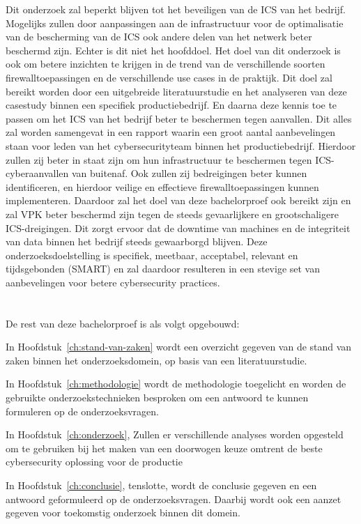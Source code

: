 Dit onderzoek zal beperkt blijven tot het beveiligen van de ICS van het bedrijf. Mogelijks zullen door aanpassingen aan de infrastructuur voor de optimalisatie van de bescherming van de ICS ook andere delen van het netwerk beter beschermd zijn. Echter is dit niet het hoofddoel. Het doel van dit onderzoek is ook om betere inzichten te krijgen in de trend van de verschillende soorten firewalltoepassingen en de verschillende use cases in de praktijk. Dit doel zal bereikt worden door een uitgebreide literatuurstudie en het analyseren van deze casestudy binnen een specifiek productiebedrijf. En daarna deze kennis toe te passen om het ICS van het bedrijf beter te beschermen tegen aanvallen. Dit alles zal worden samengevat in een rapport waarin een groot aantal aanbevelingen staan voor leden van het cybersecurityteam binnen het productiebedrijf. Hierdoor zullen zij beter in staat zijn om hun infrastructuur te beschermen tegen ICS-cyberaanvallen van buitenaf. Ook zullen zij bedreigingen beter kunnen identificeren, en hierdoor veilige en effectieve firewalltoepassingen kunnen implementeren. Daardoor zal het doel van deze bachelorproef ook bereikt zijn en zal VPK beter beschermd zijn tegen de steeds gevaarlijkere en grootschaligere ICS-dreigingen. Dit zorgt ervoor dat de downtime van machines en de integriteit van data binnen het bedrijf steeds gewaarborgd blijven. Deze onderzoeksdoelstelling is specifiek, meetbaar, acceptabel, relevant en tijdsgebonden (SMART) en zal daardoor resulteren in een stevige set van aanbevelingen voor betere cybersecurity practices.

\section{}%
\label{sec:opzet-bachelorproef}


De rest van deze bachelorproef is als volgt opgebouwd:

In Hoofdstuk~\ref{ch:stand-van-zaken} wordt een overzicht gegeven van de stand van zaken binnen het onderzoeksdomein, op basis van een literatuurstudie.

In Hoofdstuk~\ref{ch:methodologie} wordt de methodologie toegelicht en worden de gebruikte onderzoekstechnieken besproken om een antwoord te kunnen formuleren op de onderzoeksvragen.

In Hoofdstuk~\ref{ch:onderzoek}, Zullen er verschillende analyses worden opgesteld om te gebruiken bij het maken van een doorwogen keuze omtrent de beste cybersecurity oplossing voor de productie

In Hoofdstuk~\ref{ch:conclusie}, tenslotte, wordt de conclusie gegeven en een antwoord geformuleerd op de onderzoeksvragen. Daarbij wordt ook een aanzet gegeven voor toekomstig onderzoek binnen dit domein.